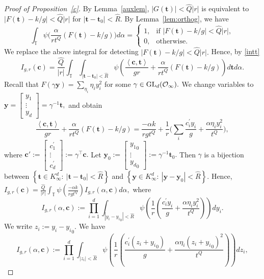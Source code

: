\documentclass[10pt]{amsart}
\theoremstyle{plain}
\theoremstyle{plain}
\renewcommand{\vec}[1]{\mathbf{#1}}
\theoremstyle{remark}
\theoremstyle{definition}
\newcommand{\hQ}{\widehat{Q}}
\newcommand{\hR}{\widehat{R}}
\newcommand{\GL}{\textup{GL}}
\newcommand{\TT}{\mathbb{T}}
\newcommand{\cO}{\mathcal{O}}
\begin{document}
\begin{proof}[Proof of Proposition~\ref{c}]
By Lemma~\ref{auxlem},  $|G(\vec{t})| < \hQ|r|$ is equivalent to $|F(\vec{t})-k/g|<\hQ |r|$ for $|\vec{t}-\vec{t}_0|<\hR.$ By Lemma~\ref{lem:orthog}, we have 
$$
\int_{\TT} \psi\Big(\frac{\alpha} {rt^Q } (F(\vec{t})-k/g)\Big) d \alpha=\begin{cases}
 1, &\mbox{if $|F(\vec{t})-k/g|< \hQ|r|$},\\
0, &\mbox{otherwise.}
\end{cases}
$$
We replace the above integral for detecting $|F(\vec{t})-k/g|< \hQ|r|.$ Hence, by \eqref{intt}
\[
I_{g,r}(\vec{c})=\frac{\hQ}{|r|} \int _{\TT}\int_{|\vec{t}-\vec{t}_0| <\hR}\psi\left(\frac{\left< \vec{c},\vec{t} \right>}{gr} +\frac{\alpha} {rt^Q } (F(\vec{t})-k/g)   \right) d\vec{t} d\alpha.\]
Recall  that $F(\gamma\vec{y})=\sum_{\eta_i} \eta_iy_i^2$ for some  $\gamma\in \GL_d(\cO_{\infty}).$  We change  variables to $\vec{y}=\begin{bmatrix}y_1 \\ \vdots \\y_d  \end{bmatrix}=\gamma^{-1} \vec{t},$ and obtain 
 \[
\frac{\left< \vec{c},\vec{t} \right>}{gr} +\frac{\alpha} {rt^Q } (F(\vec{t})-k/g)=\frac{-\alpha k}{rgt^Q}+ \frac{1}{r} \Big(\sum_{i} \frac{c_i^{\prime}y_i}{g} +\frac{\alpha  \eta_i y_i^2}{t^Q}   \big),
 \]
 where $\vec{c}':=\begin{bmatrix}c_1^{\prime} \\ \vdots \\c_d^{\prime}  \end{bmatrix}:=\gamma^{\intercal } \vec{c}.$ Let $\vec{y}_0:= \begin{bmatrix}{y_1}_0 \\ \vdots \\{y_d}_0 \end{bmatrix}:= \gamma^{-1}\vec{t}_0.$ Then 
 $\gamma$ is a bijection between  $\left\{\vec{t}\in K_\infty^d: \ |\vec{t}-\vec{t}_0|<\hR  \right\}$ and  $\left\{\vec{y}\in K_\infty^d: \ |\vec{y}-\vec{y}_0|<\hR  \right\}.$
 Hence,
 \(
I_{g,r}(\vec{c})=\frac{\hQ}{|r|} \int _{\TT} \psi(\frac{-\alpha k}{rgt^Q})  I_{g,r}(\alpha,\vec{c})d\alpha,\)
where 
\[
I_{g,r}(\alpha,\vec{c}):=\prod_{i=1}^{d}\int_{|y_i-{y_i}_0|<\hR} \psi \left( \frac{1}{r} \left( \frac{c_i^{\prime}y_i}{g} +\frac{\alpha  \eta_i y_i^2}{t^Q}   \right)\right) dy_i.
 \]
  We write $z_i:=y_i-{y_i}_0.$ We have  
 \[
I_{g,r}(\alpha,\vec{c}):=\prod_{i=1}^{d}\int_{|z_i|<\hR} \psi \left( \frac{1}{r} \left( \frac{c_i^{\prime}(z_i+{y_i}_0)}{g} +\frac{\alpha  \eta_i (z_i+{y_i}_0)^2}{t^Q}   \right)\right) dz_i,
\]
\end{proof}
\end{document}

